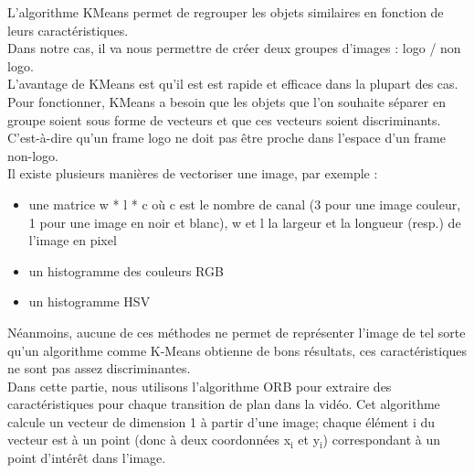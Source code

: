 \documentclass[11pt]{article}
\begin{document}
L'algorithme KMeans permet de regrouper les objets similaires en fonction de leurs caractéristiques.\\
Dans notre cas, il va nous permettre de créer deux groupes d'images : logo / non logo.\\
L'avantage de KMeans est qu'il est est rapide et efficace dans la plupart des cas.\\

Pour fonctionner, KMeans a besoin que les objets que l'on souhaite séparer en groupe soient sous forme de vecteurs et que ces vecteurs soient discriminants. C'est-à-dire qu'un frame logo ne doit pas être proche dans l'espace d'un frame non-logo.\\

Il existe plusieurs manières de vectoriser une image, par exemple :\\
\begin{itemize}
\item une matrice w * l * c où c est le nombre de canal (3 pour une image couleur, 1 pour une image en noir et blanc), w et l la largeur et la longueur (resp.) de l'image en pixel\\
\item un histogramme des couleurs RGB\\
\item un histogramme HSV\\
\end{itemize}
Néanmoins, aucune de ces méthodes ne permet de représenter l'image de tel sorte qu'un algorithme comme K-Means obtienne de bons résultats, ces caractéristiques ne sont pas assez discriminantes.\\

Dans cette partie, nous utilisons l'algorithme ORB pour extraire des caractéristiques pour chaque transition de plan dans la vidéo. Cet algorithme calcule un vecteur de dimension 1 à partir d'une image; chaque élément i du vecteur est à un point (donc à deux coordonnées x\(_{\text{i}}\) et y\(_{\text{i}}\)) correspondant à un point d'intérêt dans l'image.\\
\end{document}
